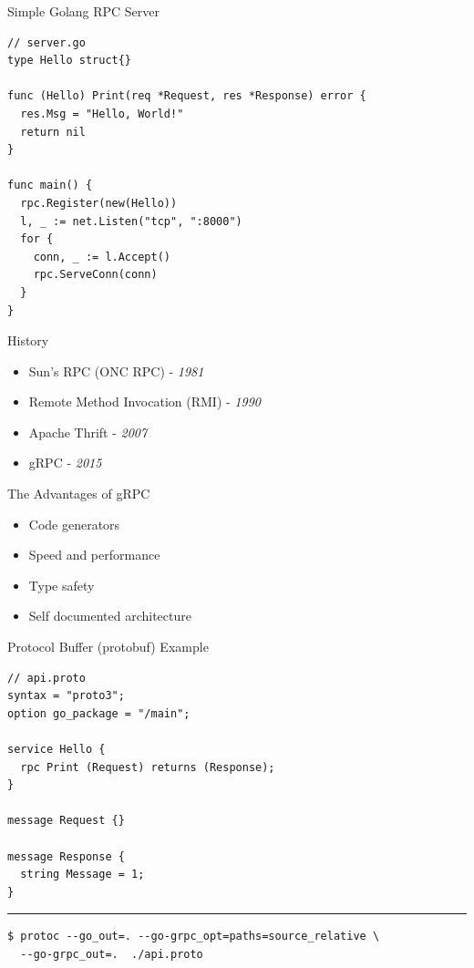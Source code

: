 \documentclass[xcolor={rgb}]{beamer}
\newcommand{\pitem}{\pause \item}
\newcounter{_i}
\begin{document}
\begin{frame}[fragile]{Simple Golang RPC Server}
  \begin{verbatim}
// server.go
type Hello struct{}

func (Hello) Print(req *Request, res *Response) error {
  res.Msg = "Hello, World!"
  return nil
}

func main() {
  rpc.Register(new(Hello))
  l, _ := net.Listen("tcp", ":8000")
  for {
    conn, _ := l.Accept()
    rpc.ServeConn(conn)
  }
}
  \end{verbatim}
\end{frame}

\begin{frame}{History}
  \begin{itemize}
    \pitem Sun's RPC (ONC RPC) - \textit{1981}
    \pitem Remote Method Invocation (RMI) - \textit{1990}
    \pitem Apache Thrift - \textit{2007}
    \pitem gRPC - \textit{2015}
  \end{itemize}
\end{frame}

\begin{frame}{The Advantages of gRPC}
  \begin{itemize}
    \pitem Code generators
    \pitem Speed and performance
    \pitem Type safety
    \pitem Self documented architecture
  \end{itemize}
\end{frame}

\begin{frame}[fragile]{Protocol Buffer (protobuf) Example}
  \begin{verbatim}
// api.proto
syntax = "proto3";
option go_package = "/main";

service Hello {
  rpc Print (Request) returns (Response);
}

message Request {}

message Response {
  string Message = 1;
}
  \end{verbatim}

  \pause

  \vspace{-0.5cm}
  \noindent\rule{\textwidth}{0.1pt}
  \begin{verbatim}
$ protoc --go_out=. --go-grpc_opt=paths=source_relative \
  --go-grpc_out=.  ./api.proto
  \end{verbatim}
\end{frame}
\end{document}
